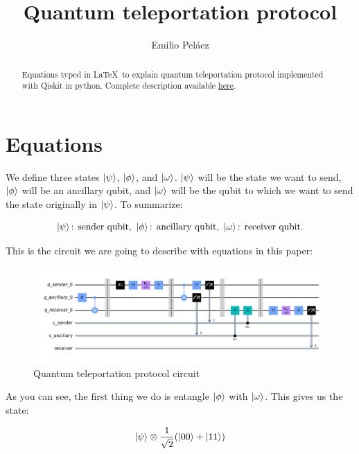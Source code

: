 \documentclass[]{article}
\title{Quantum teleportation protocol}
\author{Emilio Peláez}
\begin{document}
\maketitle

\begin{abstract}
	Equations typed in \LaTeX\ to explain quantum teleportation protocol implemented with Qiskit in python. Complete description available \href{https://github.com/epelaaez/QuantumLibrary/tree/master/algorithms/teleportation}{here}.
\end{abstract}

\section*{Equations}
We define three states $\ket{\psi}$, $\ket{\phi}$, and $\ket{\omega}$. $\ket{\psi}$ will be the state we want to send, $\ket{\phi}$ will be an ancillary qubit, and $\ket{\omega}$ will be the qubit to which we want to send the state originally in $\ket{\psi}$. To summarize:

\begin{equation}
    \ket{\psi}\textrm{: sender qubit, }\ket{\phi}\textrm{: ancillary qubit, }\ket{\omega}\textrm{: receiver qubit.}
\end{equation}

This is the circuit we are going to describe with equations in this paper:

\begin{figure}[h!] 
    \centering
    \includegraphics[scale=0.4]{images/qtp-converted.pdf}
    \caption{Quantum teleportation protocol circuit}
    \label{fig:qtp_circuit}
\end{figure}

As you can see, the first thing we do is entangle $\ket{\phi}$ with $\ket{\omega}$. This gives us the state:

\begin{equation} \label{first_entanglement}
    \ket{\psi} \otimes \frac{1}{\sqrt{2}}(\ket{00} + \ket{11})
\end{equation}
\end{document}
